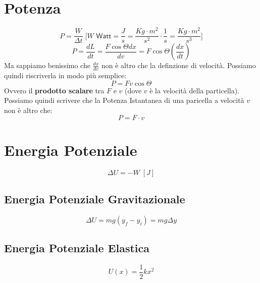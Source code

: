     
    \section*{Potenza}
        \begin{equation*}
            P = \frac{W}{\Delta t} \; \Bigg[W \textsf{  Watt} = \frac{J}{s} 
            = \frac{Kg \cdot m^2}{s^2} \cdot \frac{1}{s} 
            = \frac{Kg \cdot m^2}{s^3} \Bigg]
        \end{equation*}
        \begin{equation*}
            P = \frac{dL}{dt} = \frac{F \cos \Theta dx}{dv} 
            = F \cos \Theta (\frac{dx}{dt})
        \end{equation*}
        Ma sappiamo benissimo che $\frac{dx}{dv}$ non è altro che la definzione 
        di velocità. Possiamo quindi riscriverla in modo più semplice:
        \begin{equation*}
            P = Fv\cos\Theta
        \end{equation*}
        Ovvero il \textbf{prodotto scalare} tra $F$ e $v$ (dove $v$ è la 
        velocità della particella). Possiamo quindi scrivere che la Potenza 
        Istantanea di una paricella a velocità $v$ non è altro che:
        \begin{equation*}
            P = F \cdot v
        \end{equation*}

    \section*{Energia Potenziale}
        \begin{equation*}
            \Delta U = - W \;[J]
        \end{equation*}

        \subsection*{Energia Potenziale Gravitazionale}
        \label{en_po_gr}
            \begin{equation*}
                \Delta U = mg(y_f - y_i) = mg \Delta y
            \end{equation*}

        \subsection*{Energia Potenziale Elastica}
            \begin{equation*}
                U(x)     = \frac{1}{2}kx^2
            \end{equation*}

